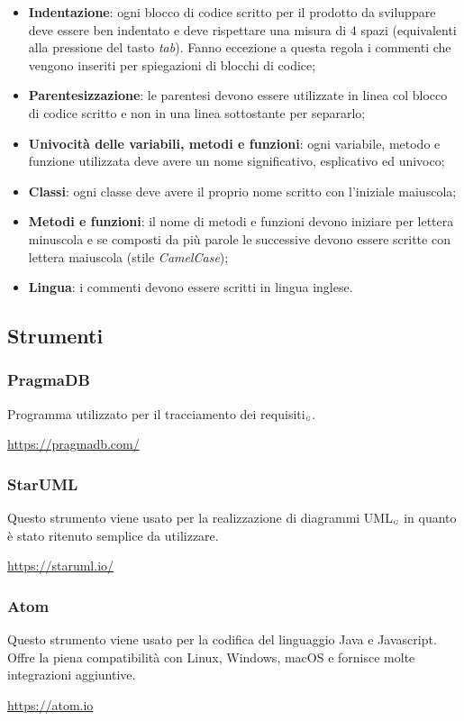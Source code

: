 \begin{itemize}
	\item \textbf{Indentazione}: ogni blocco di codice scritto per il prodotto da sviluppare deve essere ben indentato e deve rispettare una misura di 4 spazi (equivalenti alla pressione del tasto \textit{tab}). Fanno eccezione a questa regola i commenti che vengono inseriti per spiegazioni di blocchi di codice;
	\item \textbf{Parentesizzazione}: le parentesi devono essere utilizzate in linea col blocco di codice scritto e non in una linea sottostante per separarlo;
	\item \textbf{Univocità delle variabili, metodi e funzioni}: ogni variabile, metodo e funzione utilizzata deve avere un nome significativo, esplicativo ed univoco;
	\item \textbf{Classi}: ogni classe deve avere il proprio nome scritto con l'iniziale maiuscola;
	\item \textbf{Metodi e funzioni}: il nome di metodi e funzioni devono iniziare per lettera minuscola e se composti da più parole le successive devono essere scritte con lettera maiuscola (stile \textit{CamelCase});
	\item \textbf{Lingua}: i commenti devono essere scritti in lingua inglese.
\end{itemize}

\subsection{Strumenti}\label{ProcessiPrimariStrumenti}

\subsubsection{PragmaDB}\label{ProcessiPrimariStrumentiPragmaDB}
Programma utilizzato per il tracciamento dei requisiti$_{\scaleto{G}{3pt}}$.
\begin{center}
	\url{https://pragmadb.com/}
\end{center}
\subsubsection{StarUML}\label{ProcessiPrimariStrumentiDrawIo}
Questo strumento viene usato per la realizzazione di diagrammi UML$_{\scaleto{G}{3pt}}$ in quanto è stato ritenuto semplice da utilizzare.
\begin{center}
	\url{https://staruml.io/}
\end{center}
\subsubsection{Atom}\label{ProcessiPrimariStrumentiAtom}
Questo strumento viene usato per la codifica del linguaggio Java e Javascript. Offre la piena compatibilità con Linux, Windows, macOS e fornisce molte integrazioni aggiuntive.
\begin{center}
	\url{https://atom.io}
\end{center}